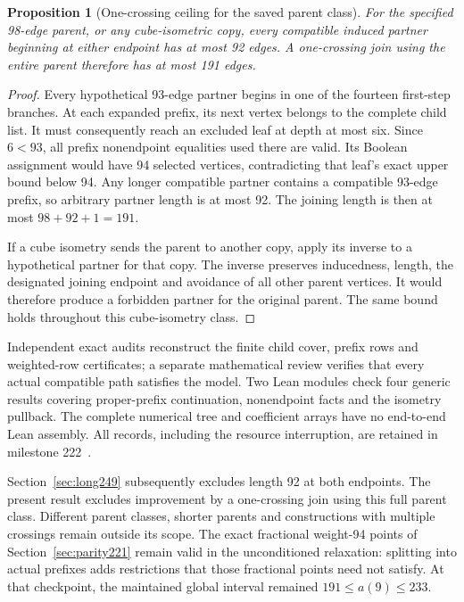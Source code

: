 \documentclass[11pt,a4paper]{article}
\newtheorem{proposition}[theorem]{Proposition}
\theoremstyle{definition}
\theoremstyle{remark}
\begin{document}
\begin{proposition}[One-crossing ceiling for the saved parent class]
\label{prop:parent191}
For the specified 98-edge parent, or any cube-isometric copy, every
compatible induced partner beginning at either endpoint has at most
92 edges. A one-crossing join using the entire parent therefore has
at most 191 edges.
\end{proposition}
\begin{proof}
Every hypothetical 93-edge partner begins in one of the fourteen
first-step branches. At each expanded prefix, its next vertex belongs
to the complete child list. It must consequently reach an excluded leaf
at depth at most six. Since $6<93$, all prefix nonendpoint equalities
used there are valid. Its Boolean assignment would have 94 selected
vertices, contradicting that leaf's exact upper bound below 94.
Any longer compatible partner contains a compatible 93-edge prefix,
so arbitrary partner length is at most 92. The joining length is then
at most $98+92+1=191$.

If a cube isometry sends the parent to another copy, apply its inverse
to a hypothetical partner for that copy. The inverse preserves inducedness,
length, the designated joining endpoint and avoidance of all other parent
vertices. It would therefore produce a forbidden partner for the original
parent. The same bound holds throughout this cube-isometry class.
\end{proof}

Independent exact audits reconstruct the finite child cover, prefix rows
and weighted-row certificates; a separate mathematical review verifies
that every actual compatible path satisfies the model. Two Lean modules
check four generic results covering proper-prefix continuation, nonendpoint
facts and the isometry pullback. The complete numerical tree and coefficient
arrays have no end-to-end Lean assembly. All records, including the resource
interruption, are retained in milestone 222~\cite{research222}.

Section~\ref{sec:long249} subsequently excludes length 92 at both endpoints.
The present result excludes improvement by a one-crossing join using
this full parent class. Different parent classes, shorter parents and
constructions with multiple crossings remain outside its scope.
The exact fractional weight-94 points of Section~\ref{sec:parity221}
remain valid in the unconditioned relaxation: splitting into actual
prefixes adds restrictions that those fractional points need not satisfy.
At that checkpoint, the maintained global interval remained
$191\le a(9)\le233$.
\end{document}
